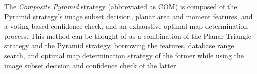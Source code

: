 The \textit{Composite Pyramid} strategy (abbreviated as COM) is composed of the Pyramid strategy's image subset decision, planar area and moment features, and a voting based confidence check, and an exhaustive optimal map determination process.
This method can be thought of as a combination of the Planar Triangle strategy and the Pyramid strategy, borrowing the features, database range search, and optimal map determination strategy of the former while using the image subset decision and confidence check of the latter.

%


%    
